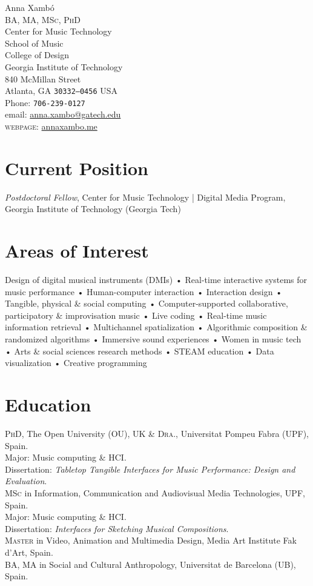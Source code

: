 \documentclass[10pt, a4paper]{article}
\newcommand{\years}[1]{\marginnote{\scriptsize #1}}
\begin{document}
{\Huge Anna Xambó}\\[0.1cm]
\textsc{BA, MA, MSc, PhD}\\[1cm]
Center for Music Technology\\
School of Music\\
College of Design\\
Georgia Institute of Technology\\
840 McMillan Street\\
Atlanta, GA  \texttt{30332--0456}
USA\\[.2cm]
Phone: \texttt{706-239-0127}\\
email: \href{mailto:anna.xambo@gatech.edu}{anna.xambo@gatech.edu}\\
\textsc{webpage}: \href{http://annaxambo.me/}{annaxambo.me}\\ 

\section*{Current Position}
\emph{Postdoctoral Fellow}, Center for Music Technology | Digital Media Program, Georgia Institute of Technology (Georgia Tech)

\section*{Areas of Interest}
Design of digital musical instruments (DMIs) • Real-time interactive systems for music performance • Human-computer interaction • Interaction design • Tangible, physical \& social computing • Computer-supported collaborative, participatory \& improvisation music • Live coding • Real-time music information retrieval • Multichannel spatialization • Algorithmic composition \& randomized algorithms • Immersive sound experiences • Women in music tech • Arts \& social sciences research methods • STEAM education • Data visualization • Creative programming 

\section*{Education}
\noindent
\years{2015}\textsc{PhD}, The Open University (OU), UK \& \textsc{Dra.}, Universitat Pompeu Fabra (UPF), Spain.\\
Major: Music computing \& HCI.\\ 
Dissertation: \emph{Tabletop Tangible Interfaces for Music Performance: Design and Evaluation}.\\
\years{2008}\textsc{MSc} in Information, Communication and Audiovisual Media Technologies, UPF, Spain.\\
Major: Music computing \& HCI.\\ 
Dissertation: \emph{Interfaces for Sketching Musical Compositions}.\\
\years{1999}\textsc{Master} in Video, Animation and Multimedia Design, Media Art Institute Fak d'Art, Spain.\\
\years{1996}\textsc{BA, MA} in Social and Cultural Anthropology, Universitat de Barcelona (UB), Spain.
\end{document}
